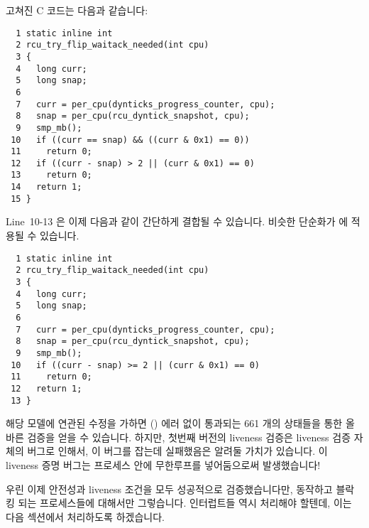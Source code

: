 고쳐진 C 코드는 다음과 같습니다:
\iffalse

The first part of the condition is correct, because if \co{curr}
and \co{snap} differ by two, there will be at least one even
number in between, corresponding to having passed completely through
a dynticks-idle phase.
However, the second part of the condition corresponds to having
\emph{started} in dynticks-idle mode, not having \emph{finished}
in this mode.
We therefore need to be testing \co{curr} rather than
\co{snap} for being an even number.

The corrected C code is as follows:
\fi

{ \scriptsize
\begin{verbatim}
  1 static inline int
  2 rcu_try_flip_waitack_needed(int cpu)
  3 {
  4   long curr;
  5   long snap;
  6
  7   curr = per_cpu(dynticks_progress_counter, cpu);
  8   snap = per_cpu(rcu_dyntick_snapshot, cpu);
  9   smp_mb();
 10   if ((curr == snap) && ((curr & 0x1) == 0))
 11     return 0;
 12   if ((curr - snap) > 2 || (curr & 0x1) == 0)
 13     return 0;
 14   return 1;
 15 }
\end{verbatim}
}

Line~10-13 은 이제 다음과 같이 간단하게 결합될 수 있습니다.
비슷한 단순화가  에 적용될 수 있습니다.
\iffalse

Lines~10-13 can now be combined and simplified,
resulting in the following.
A similar simplification can be applied to
\co{rcu_try_flip_waitmb_needed()}.
\fi

{ \scriptsize
\begin{verbatim}
  1 static inline int
  2 rcu_try_flip_waitack_needed(int cpu)
  3 {
  4   long curr;
  5   long snap;
  6
  7   curr = per_cpu(dynticks_progress_counter, cpu);
  8   snap = per_cpu(rcu_dyntick_snapshot, cpu);
  9   smp_mb();
 10   if ((curr - snap) >= 2 || (curr & 0x1) == 0)
 11     return 0;
 12   return 1;
 13 }
\end{verbatim}
}

해당 모델에 연관된 수정을 가하면 () 에러 없이
통과되는 661 개의 상태들을 통한 올바른 검증을 얻을 수 있습니다.
하지만, 첫번째 버전의 liveness 검증은 liveness 검증 자체의 버그로 인해서, 이
버그를 잡는데 실패했음은 알려둘 가치가 있습니다.
이 liveness 증명 버그는  프로세스 안에 무한루프를
넣어둠으로써 발생했습니다!

우린 이제 안전성과 liveness 조건을 모두 성공적으로 검증했습니다만, 동작하고
블락킹 되는 프로세스들에 대해서만 그렇습니다.
인터럽트들 역시 처리해야 할텐데, 이는 다음 섹션에서 처리하도록 하겠습니다.
\iffalse

